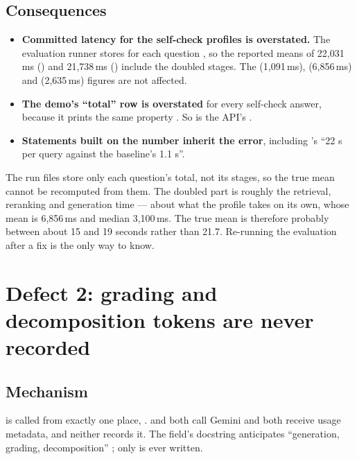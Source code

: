 \subsection{Consequences}

\begin{itemize}
  \item \textbf{Committed latency for the self-check profiles is overstated.} The evaluation runner stores  for each question , so the reported means of 22,031\,ms () and 21,738\,ms () include the doubled stages. The  (1,091\,ms),  (6,856\,ms) and  (2,635\,ms) figures are not affected. \tagV
  \item \textbf{The demo's \enquote{total} row is overstated} for every self-check answer, because it prints the same property . So is the API's . \tagV
  \item \textbf{Statements built on the number inherit the error}, including 's \enquote{22 s per query against the baseline's 1.1 s}. \tagV
\end{itemize}

\begin{inferred}
The run files store only each question's total, not its stages, so the true mean cannot be recomputed from them. The doubled part is roughly the retrieval, reranking and generation time --- about what the  profile takes on its own, whose mean is 6,856\,ms and median 3,100\,ms. The true  mean is therefore probably between about 15 and 19 seconds rather than 21.7. Re-running the evaluation after a fix is the only way to know.
\end{inferred}

\section{Defect 2: grading and decomposition tokens are never recorded}
\label{sec:token-bug}

\subsection{Mechanism}

 is called from exactly one place,  .  and  both call Gemini and both receive usage metadata, and neither records it. The  field's docstring anticipates \enquote{generation, grading, decomposition} ; only  is ever written.

